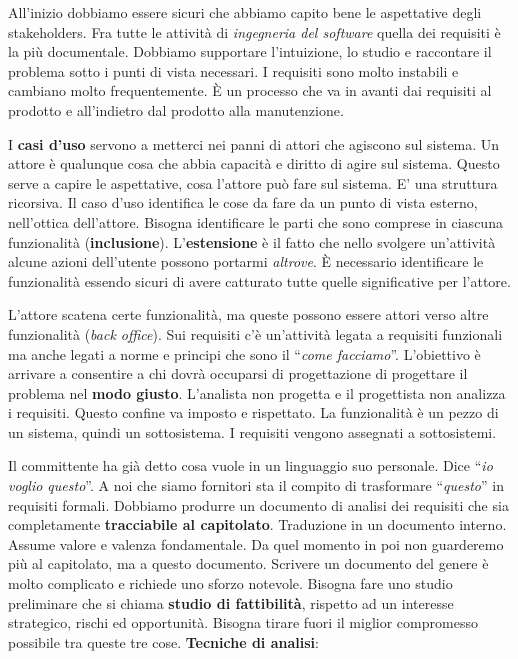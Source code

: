 All'inizio dobbiamo essere sicuri che abbiamo capito bene le aspettative degli stakeholders. Fra tutte le attività di \textit{ingegneria del software} quella dei requisiti è la più documentale. Dobbiamo supportare l'intuizione, lo studio e raccontare il problema sotto i punti di vista necessari. I requisiti sono molto instabili e cambiano molto frequentemente. È un processo che va in avanti dai requisiti al prodotto e all'indietro dal prodotto alla manutenzione. 

I \textbf{casi d'uso} servono a metterci nei panni di attori che agiscono sul sistema. Un attore è qualunque cosa che abbia capacità e diritto di agire sul sistema. Questo serve a capire le aspettative, cosa l'attore può fare sul sistema. E' una struttura ricorsiva. Il caso d'uso identifica le cose da fare da un punto di vista esterno, nell'ottica dell'attore. Bisogna identificare le parti che sono comprese in ciascuna funzionalità (\textbf{inclusione}). L'\textbf{estensione} è il fatto che nello svolgere un'attività alcune azioni dell'utente possono portarmi \textit{altrove}. È necessario identificare le funzionalità essendo sicuri di avere catturato tutte quelle significative per l'attore. 

L'attore scatena certe funzionalità, ma queste possono essere attori verso altre funzionalità (\textit{back office}). Sui requisiti c'è un'attività legata a requisiti funzionali ma anche legati a norme e principi che sono il ``\textit{come facciamo}''. L'obiettivo è arrivare a consentire a chi dovrà occuparsi di progettazione di progettare il problema nel \textbf{modo giusto}. L'analista non progetta e il progettista non analizza i requisiti. Questo confine va imposto e rispettato. La funzionalità è un pezzo di un sistema, quindi un sottosistema. I requisiti vengono assegnati a sottosistemi.

Il committente ha già detto cosa vuole in un linguaggio suo personale. Dice ``\textit{io voglio questo}''. A noi che siamo fornitori sta il compito di trasformare ``\textit{questo}'' in requisiti formali. Dobbiamo produrre un documento di analisi dei requisiti che sia completamente \textbf{tracciabile al capitolato}. Traduzione in un documento interno. Assume valore e valenza fondamentale. Da quel momento in poi non guarderemo più al capitolato, ma a questo documento. Scrivere un documento del genere è molto complicato e richiede uno sforzo notevole. Bisogna fare uno studio preliminare che si chiama \textbf{studio di fattibilità}, rispetto ad un interesse strategico, rischi ed opportunità. Bisogna tirare fuori il miglior compromesso possibile tra queste tre cose. \textbf{Tecniche di analisi}:

